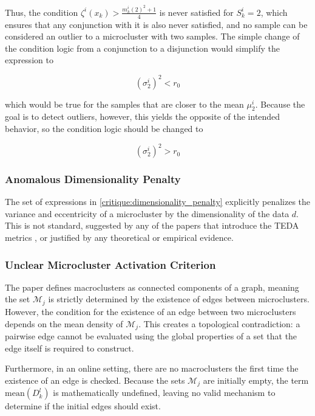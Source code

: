 \documentclass[a4paper]{article}
\begin{document}
Thus, the condition $\zeta^i(x_k) > \frac{m^i_k(2)^2 + 1}{4}$ is never satisfied for $S^i_k = 2$, which ensures that any conjunction with it is also never satisfied, and no sample can be considered an outlier to a microcluster with two samples. The simple change of the condition logic from a conjunction to a disjunction would simplify the expression to

\begin{equation}
    \left( \sigma^i_2 \right)^2 < r_0
\end{equation}

which would be true for the samples that are closer to the mean $\mu^i_2$. Because the goal is to detect outliers, however, this yields the opposite of the intended behavior, so the condition logic should be changed to

\begin{equation}
    \left( \sigma^i_2 \right)^2 > r_0
\end{equation}

\subsubsection{Anomalous Dimensionality Penalty} \label{sss:dimensionality_penalty}

The set of expressions in \cref{critique:dimensionality_penalty} explicitly penalizes the variance and eccentricity of a microcluster by the dimensionality of the data $d$. This is not standard, suggested by any of the papers that introduce the TEDA metrics \cite{angelov2014outside, angelov2014anomaly}, or justified by any theoretical or empirical evidence.

\subsubsection{Unclear Microcluster Activation Criterion} \label{sss:unclear_microcluster_activation_criterion}

The paper defines macroclusters as connected components of a graph, meaning the set $\mathcal{M}_j$ is strictly determined by the existence of edges between microclusters. However, the condition for the existence of an edge between two microclusters depends on the mean density of $\mathcal{M}_j$. This creates a topological contradiction: a pairwise edge cannot be evaluated using the global properties of a set that the edge itself is required to construct.

Furthermore, in an online setting, there are no macroclusters the first time the existence of an edge is checked. Because the sets $\mathcal{M}_j$ are initially empty, the term $\text{mean}\left(D^l_k\right)$ is mathematically undefined, leaving no valid mechanism to determine if the initial edges should exist.
\end{document}

